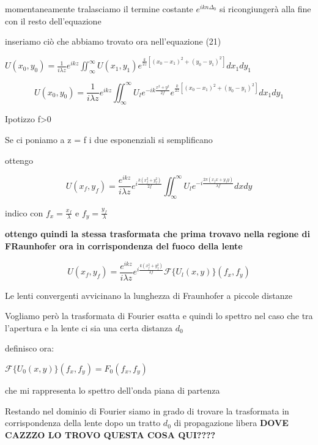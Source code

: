 \documentclass{article}
\begin{document}
momentaneamente tralasciamo il termine costante $e^{i k n \Delta_{0}}$ si ricongiungerà alla fine con il resto dell'equazione %

inseriamo ciò che abbiamo trovato ora nell'equazione (21)

$
U(x_{0}, y_{0})= \frac{1}{i \lambda z} e^{i k z}  \iint_{\infty}^{\infty} U(x_{1}, y_{1}) e^{\frac{k}{2z} [(x_{0}- x_{1})^{2} + (y_{0}- y_{1})^{2}]}dx_{1}dy_{1}
$

\begin{equation}
U(x_{0}, y_{0})= \frac{1}{i \lambda z} e^{i k z}  \iint_{\infty}^{\infty} U_{l}  e^{- i k \frac{x^{2}+ y^{2}}{2 f} } e^{\frac{k}{2z} [(x_{0}- x_{1})^{2} + (y_{0}- y_{1})^{2}]}dx_{1}dy_{1}
\end{equation}

Ipotizzo f>0

Se  ci poniamo a z = f i due esponenziali si semplificano

ottengo

\begin{equation}
U(x_{f}, y_{f})= \frac{ e^{i k z}}{i \lambda z} e^{i \frac{k (x_{f}^{2} + y_{f}^{2})}{2f}} \iint_{\infty}^{\infty} U_{l}  e^{-i 		\frac{2\pi (x_{f} x + y_{f} y)}{\lambda f}		}dxdy
\end{equation}


indico con $f_{x} = \frac{x_{f}}{\lambda}$ e $f_{y} = \frac{y_{f}}{\lambda}$


\textbf{ottengo quindi la stessa trasformata che prima trovavo nella regione di FRaunhofer ora in corrispondenza del fuoco della lente}

\begin{equation}
U(x_{f}, y_{f}) =  \frac{ e^{i k z}}{i \lambda z} e^{i \frac{k (x_{f}^{2} + y_{f}^{2})}{2f}} \mathscr{F} \{	U_{l}(x,y)	\} ( f_{x}, f_{y})
\end{equation}


Le lenti convergenti avvicinano la lunghezza di Fraunhofer a piccole distanze

Vogliamo però la trasformata di Fourier esatta  e quindi lo spettro nel caso che tra l'apertura e la lente ci sia una certa distanza $d_{0}$



definisco ora:

$\mathscr{F} \{	U_{0}(x,y)	\} ( f_{x}, f_{y})  = F_{0}(f_{x}, f_{y})$

che mi rappresenta lo spettro dell'onda piana di partenza

Restando nel dominio di Fourier siamo in grado di trovare la trasformata in corrispondenza della lente dopo un tratto $d_{0}$ di propagazione libera
\textbf{DOVE CAZZZO LO TROVO QUESTA COSA QUI????}
\end{document}
